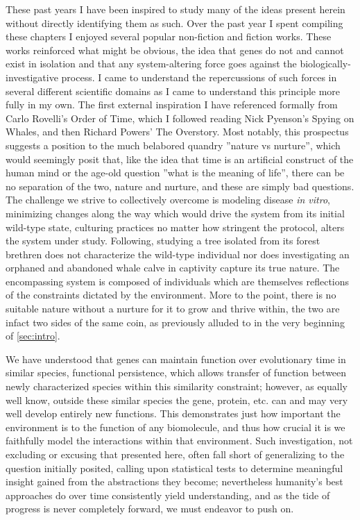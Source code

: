 These past years I have been inspired to study many of the ideas present herein without directly identifying them as such. Over the past year I spent compiling these chapters I enjoyed several popular non-fiction and fiction works. These works reinforced what might be obvious, the idea that genes do not and cannot exist in isolation and that any system-altering force goes against the biologically-investigative process. I came to understand the repercussions of such forces in several different scientific domains as I came to understand this principle more fully in my own. The first external inspiration I have referenced formally from Carlo Rovelli's Order of Time\cite{rovelli}, which I followed reading Nick Pyenson's Spying on Whales\cite{pyenson},  and then Richard Powers' The Overstory\cite{powers}. Most notably, this prospectus suggests a position to the much belabored quandry ''nature vs nurture'', which would seemingly posit that, like the idea that time is an artificial construct of the human mind or the age-old question ''what is the meaning of life'', there can be no separation of the two, nature and nurture, and these are simply bad questions. The challenge we strive to collectively overcome is modeling disease \emph{in vitro}, minimizing changes along the way which would drive the system from its initial wild-type state, \eg culturing practices no matter how stringent the protocol, alters the system under study. Following, studying a tree isolated from its forest brethren does not characterize the wild-type individual nor does investigating an orphaned and abandoned whale calve in captivity capture its true nature. The encompassing system is composed of individuals which are themselves reflections of the constraints dictated by the environment. More to the point, there is no suitable nature without a nurture for it to grow and thrive within, the two are infact two sides of the same coin, as previously alluded to in the very beginning of \cref{sec:intro}.

We have understood that genes can maintain function over evolutionary time in similar species, \ie functional persistence, which allows transfer of function between newly characterized species within this similarity constraint; however, as equally well know, outside these similar species the gene, protein, etc. can and may very well develop entirely new functions. This demonstrates just how important the environment is to the function of any biomolecule, and thus how crucial it is we faithfully model the interactions within that environment. Such investigation, not excluding or excusing that presented here, often fall short of generalizing to the question initially posited, calling upon statistical tests to determine meaningful insight gained from the abstractions they become; nevertheless humanity's best approaches do over time consistently yield understanding, and as the tide of progress is never completely forward, we must endeavor to push on.

